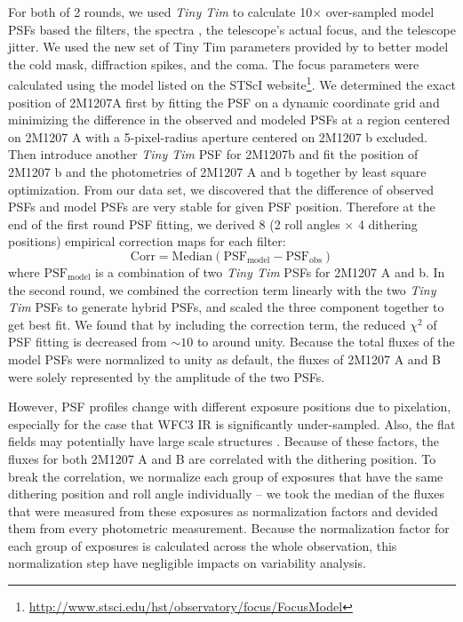 \documentclass[apj]{emulateapj}
\newcommand{\tinytim}{\textit{Tiny Tim}}
\begin{document}
For both of 2 rounds, we used {\em Tiny Tim} to calculate 10$\times$
over-sampled model PSFs based the filters, the spectra 
\citep{Bonnefoy2014, Patience2010}, the telescope's actual focus, and
the telescope jitter.  We used the new set of Tiny Tim parameters
provided by \cite{Biretta2014} to better model the cold mask,
diffraction spikes, and the coma. The focus parameters were calculated
using the model listed on the STScI
website\footnote{\url{http://www.stsci.edu/hst/observatory/focus/FocusModel}}.
We determined the exact position of 2M1207A first by fitting the PSF
on a dynamic coordinate grid and minimizing the difference in the
observed and modeled PSFs at a region centered on 2M1207 A with a
5-pixel-radius aperture centered on 2M1207 b excluded. Then introduce
another \tinytim{} PSF for 2M1207b and  fit the
position of 2M1207 b and the photometries of 2M1207 A and b together
by least square optimization. From our data set, we discovered that
the difference of observed PSFs and model PSFs are very stable for
given PSF position. Therefore at the end of the first round PSF
fitting, we derived 8 (2 roll angles $\times$ 4 dithering positions)
empirical correction maps for each filter:
\begin{equation}
  \mathrm{Corr = Median(PSF_{model} - PSF_{obs} )}
\end{equation}
where $\mathrm{PSF_{model}}$ is a combination of two \tinytim{} PSFs
for 2M1207 A and b. In the second round, we combined the correction
term linearly with the two \tinytim{} PSFs to generate hybrid PSFs,
and scaled the three component together to get best fit. We found that by including the correction term,
the reduced $\chi^{2}$ of PSF fitting is decreased from $\sim 10$ to
around unity. Because the total fluxes of the model PSFs were
normalized to unity as default, the fluxes of 2M1207 A and B were
solely represented by the amplitude of the two PSFs.

However, PSF profiles change with different exposure positions due to
pixelation, especially for the case that WFC3 IR is significantly
under-sampled. Also, the flat fields may potentially have large scale
structures \citep{dressel2012wide}. Because of these factors, the
fluxes for both 2M1207 A and B are correlated with the dithering
position. To break the correlation, we normalize each group of
exposures that have the same dithering position and roll angle
individually -- we took the median of the fluxes that were measured
from these exposures as normalization factors and devided them from
every photometric measurement. Because the normalization factor for
each group of exposures is calculated across the whole observation,
this normalization step have negligible impacts on variability
analysis.
\end{document}

